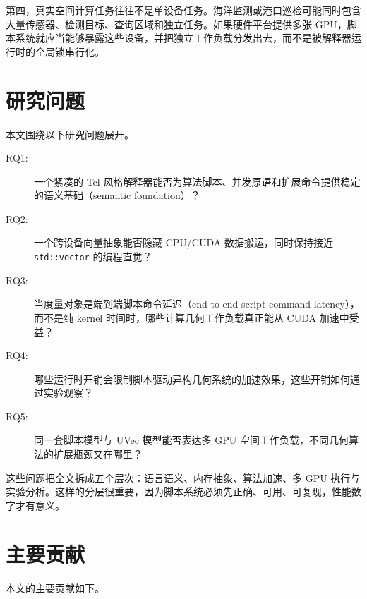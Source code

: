第四，真实空间计算任务往往不是单设备任务。海洋监测或港口巡检可能同时包含大量传感器、检测目标、查询区域和独立任务。如果硬件平台提供多张 GPU，脚本系统就应当能够暴露这些设备，并把独立工作负载分发出去，而不是被解释器运行时的全局锁串行化。

\section{研究问题}
本文围绕以下研究问题展开。

\begin{description}
  \item[RQ1:] 一个紧凑的 Tcl 风格解释器能否为算法脚本、并发原语和扩展命令提供稳定的语义基础（semantic foundation）？
  \item[RQ2:] 一个跨设备向量抽象能否隐藏 CPU/CUDA 数据搬运，同时保持接近 \texttt{std::vector} 的编程直觉？
  \item[RQ3:] 当度量对象是端到端脚本命令延迟（end-to-end script command latency），而不是纯 kernel 时间时，哪些计算几何工作负载真正能从 CUDA 加速中受益？
  \item[RQ4:] 哪些运行时开销会限制脚本驱动异构几何系统的加速效果，这些开销如何通过实验观察？
  \item[RQ5:] 同一套脚本模型与 UVec 模型能否表达多 GPU 空间工作负载，不同几何算法的扩展瓶颈又在哪里？
\end{description}

这些问题把全文拆成五个层次：语言语义、内存抽象、算法加速、多 GPU 执行与实验分析。这样的分层很重要，因为脚本系统必须先正确、可用、可复现，性能数字才有意义。

\section{主要贡献}
本文的主要贡献如下。

